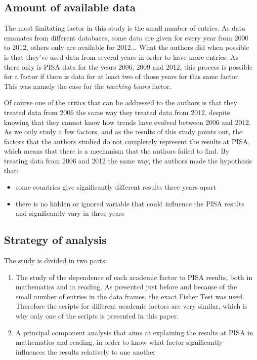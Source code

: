 \documentclass[12pt,a4paper]{article}
\begin{document}
\subsection{Amount of available data}

The most limitating factor in this study is the small number of entries. As data emanates from different databases, some data are given for every year from 2000 to 2012, others only are available for 2012...
What the authors did when possible is that they've used data from several years in order to have more entries. As there only is PISA data for the years 2006, 2009 and 2012, this process is possible for a factor if there is data for at least two of those years for this same factor.
This was namely the case for the \textit{teaching hours} factor.

Of course one of the critics that can be addressed to the authors is that they treated data from 2006 the same way they treated data from 2012, despite knowing that they cannot know how trends have evolved between 2006 and 2012. As we only study a few factors, and as the results of this study points out, the factors that the authors studied do not completely represent the results at PISA, which means that there is a mechanism that the authors failed to find. By treating data from 2006 and 2012 the same way, the authors made the hypothesis that:
\begin{itemize}
	\item some countries give significantly different results three years apart
	\item there is no hidden or ignored variable that could influence the PISA results and significantly vary in three years
\end{itemize}

\subsection{Strategy of analysis}

The study is divided in two parts:
\begin{enumerate}
	\item The study of the dependence of each academic factor to PISA results, both in mathematics and in reading. As presented just before and because of the small number of entries in the data frames, the exact Fisher Test was used. Therefore the scripts for different academic factors are very similar, which is why only one of the scripts is presented in this paper.
	\item A principal component analysis that aims at explaining the results at PISA in mathematics and reading, in order to know what factor significantly influences the results relatively to one another
\end{enumerate}
\end{document}
